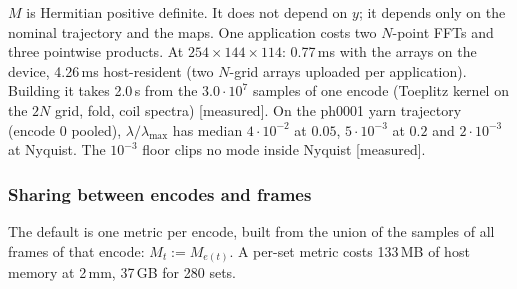 \documentclass[11pt]{article}
\theoremstyle{remark}
\begin{document}
$M$ is Hermitian positive definite. It does not depend on $y$; it depends only on the nominal trajectory and the maps.
One application costs two $N$-point FFTs and three pointwise products.
At $254\times144\times114$: 0.77\,ms with the arrays on the device, 4.26\,ms host-resident (two $N$-grid arrays uploaded per application). Building it takes 2.0\,s from the $3.0\cdot10^7$ samples of one encode (Toeplitz kernel on the $2N$ grid, fold, coil spectra) [measured].
On the ph0001 yarn trajectory (encode 0 pooled), $\lambda/\lambda_{\max}$ has median $4\cdot10^{-2}$ at $0.05$, $5\cdot10^{-3}$ at $0.2$ and $2\cdot10^{-3}$ at Nyquist. The $10^{-3}$ floor clips no mode inside Nyquist [measured].

\subsubsection*{Sharing between encodes and frames}
The default is one metric per encode, built from the union of the samples of all frames of that encode: $M_t:=M_{e(t)}$.
A per-set metric costs 133\,MB of host memory at 2\,mm, 37\,GB for 280 sets.
\end{document}
